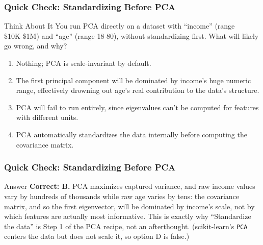 \begin{frame}[fragile]\frametitle{Quick Check: Standardizing Before PCA}
\begin{block}{Think About It}
You run PCA directly on a dataset with ``income'' (range \$10K-\$1M) and ``age'' (range
18-80), without standardizing first. What will likely go wrong, and why?
\begin{enumerate}
  \item[A.] Nothing; PCA is scale-invariant by default.
  \item[B.] The first principal component will be dominated by income's huge numeric range,
  effectively drowning out age's real contribution to the data's structure.
  \item[C.] PCA will fail to run entirely, since eigenvalues can't be computed for features
  with different units.
  \item[D.] PCA automatically standardizes the data internally before computing the
  covariance matrix.
\end{enumerate}
\end{block}
\end{frame}

\begin{frame}[fragile]\frametitle{Quick Check: Standardizing Before PCA}
\begin{block}{Answer}
\textbf{Correct: B.} PCA maximizes captured variance, and raw income values vary by
hundreds of thousands while raw age varies by tens: the covariance matrix, and so the first
eigenvector, will be dominated by income's scale, not by which features are actually most
informative. This is exactly why ``Standardize the data'' is Step 1 of the PCA recipe, not
an afterthought. (scikit-learn's \texttt{PCA} centers the data but does not scale it, so option D is false.)
\end{block}
\end{frame}

